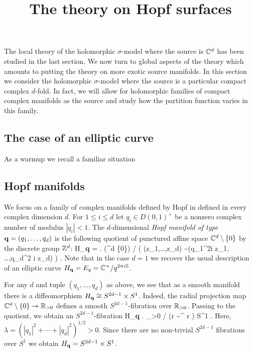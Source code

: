 \documentclass[10pt]{amsart}
\title{The theory on Hopf surfaces}
\begin{document}
\maketitle

The local theory of the holomorphic $\sigma$-model where the source is $\mathbb C^d$ has been studied in the last section.
We now turn to global aspects of the theory which amounts to putting the theory on more exotic source manifolds. 
In this section we consider the holomorphic $\sigma$-model where the source is a particular compact complex $d$-fold. 
In fact, we will allow for holomorphic families of compact complex manifolds as the source and study how the partition function varies in this family. 

\subsection{The case of an elliptic curve}

As a warmup we recall a familiar situation 

\subsection{Hopf manifolds}

We focus on a family of complex manifolds defined by Hopf in \cite{Hopf} defined in every complex dimension $d$. 
For $1 \leq i \leq d$ let $q_i \in D(0,1)^{\times}$ be a nonzero complex number of modulus $|q_i| <1$. 
The $d$-dimensional {\em Hopf manifold of type} ${\bf q} = (q_1,\ldots,q_d)$ is the following quotient of punctured affine space $\mathbb C^d \setminus \{0\}$ by the discrete group $\mathbb Z^d$:
\ben
H_{\bf q} = \left. \left(\CC^d \setminus \{0\}\right) \right/ \left( (z_1,\ldots,z_d) \sim (q_1^{2\pi i \ZZ} z_1, \ldots,q_d^{2 \pi i \ZZ} z_d) \right) .
\een
Note that in the case $d = 1$ we recover the usual description of an elliptic curve $H_{\bf q} = E_q = \mathbb C^\times / q^{2 \pi i \mathbb Z}$. 

For any $d$ and tuple $(q_1,\ldots, q_d)$ as above, we see that as a smooth manifold there is a diffeomorphism $H_{\bf q} \cong S^{2d-1} \times S^1$. 
Indeed, the radial projection map $\mathbb C^d \setminus \{0\} \to \mathbb R_{>0}$ defines a smooth $S^{2d-1}$-fibration over $\mathbb R_{>0}$. 
Passing to the quotient, we obtain an $S^{2d - 1}$-fibration 
\ben
H_{\bf q} \to \left. \RR_{>0} \right/ \left(r \sim \lambda^{\ZZ} \cdot r \right) \cong S^1 .
\een
Here, $\lambda = (|q_1|^2 + \cdots + |q_d|^2)^{1/2} > 0$. 
Since there are no non-trivial $S^{2d-1}$ fibrations over $S^1$ we obtain $H_{\bf q} = S^{2d-1} \times S^1$. 
\end{document}
